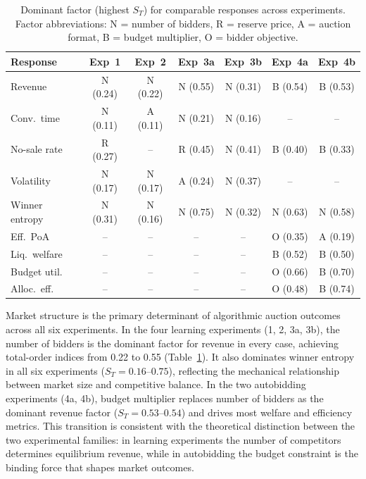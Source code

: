 \begin{table}[H]
\centering
\caption{Dominant factor (highest $S_T$) for comparable responses across experiments. Factor abbreviations: N = number of bidders, R = reserve price, A = auction format, B = budget multiplier, O = bidder objective.}
\label{tab:sens_dominant}
\small
\setlength{\tabcolsep}{4pt}
\begin{tabular}{l cccccc}
\toprule
Response & Exp~1 & Exp~2 & Exp~3a & Exp~3b & Exp~4a & Exp~4b \\
\midrule
Revenue        & N (0.24) & N (0.22) & N (0.55) & N (0.31) & B (0.54) & B (0.53) \\
Conv.\ time    & N (0.11) & A (0.11) & N (0.21) & N (0.16) & -- & -- \\
No-sale rate   & R (0.27) & -- & R (0.45) & N (0.41) & B (0.40) & B (0.33) \\
Volatility     & N (0.17) & N (0.17) & A (0.24) & N (0.37) & -- & -- \\
Winner entropy & N (0.31) & N (0.16) & N (0.75) & N (0.32) & N (0.63) & N (0.58) \\
\midrule
Eff.\ PoA      & -- & -- & -- & -- & O (0.35) & A (0.19) \\
Liq.\ welfare  & -- & -- & -- & -- & B (0.52) & B (0.50) \\
Budget util.   & -- & -- & -- & -- & O (0.66) & B (0.70) \\
Alloc.\ eff.   & -- & -- & -- & -- & O (0.48) & B (0.74) \\
\bottomrule
\end{tabular}
\end{table}

Market structure is the primary determinant of algorithmic auction outcomes across all six experiments. In the four learning experiments (1, 2, 3a, 3b), the number of bidders is the dominant factor for revenue in every case, achieving total-order indices from 0.22 to 0.55 (Table~\ref{tab:sens_dominant}). It also dominates winner entropy in all six experiments ($S_T = 0.16$--$0.75$), reflecting the mechanical relationship between market size and competitive balance. In the two autobidding experiments (4a, 4b), budget multiplier replaces number of bidders as the dominant revenue factor ($S_T = 0.53$--$0.54$) and drives most welfare and efficiency metrics. This transition is consistent with the theoretical distinction between the two experimental families: in learning experiments the number of competitors determines equilibrium revenue, while in autobidding the budget constraint is the binding force that shapes market outcomes.

